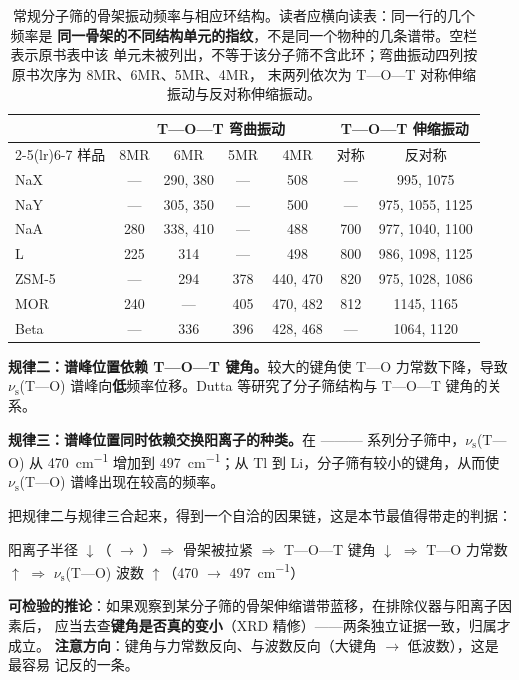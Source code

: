\begin{table}[htbp]
\centering
\caption{常规分子筛的骨架振动频率与相应环结构。读者应横向读表：同一行的几个频率是
\textbf{同一骨架的不同结构单元的指纹}，不是同一个物种的几条谱带。空栏表示原书表中该
单元未被列出，不等于该分子筛不含此环；弯曲振动四列按原书次序为 8MR、6MR、5MR、4MR，
末两列依次为 T—O—T 对称伸缩振动与反对称伸缩振动。}
\label{tab:zeolite-ring}
{\srcsize
\begin{tabularx}{\columnwidth}{@{}lcccccc@{}}
\toprule
 & \multicolumn{4}{c}{T—O—T 弯曲振动} & \multicolumn{2}{c}{T—O—T 伸缩振动} \\
\cmidrule(lr){2-5}\cmidrule(lr){6-7}
样品 & 8MR & 6MR & 5MR & 4MR & 对称 & 反对称 \\
\midrule
NaX   & --- & 290, 380 & --- & 508 & --- & 995, 1075 \\
NaY   & --- & 305, 350 & --- & 500 & --- & 975, 1055, 1125 \\
NaA   & 280 & 338, 410 & --- & 488 & 700 & 977, 1040, 1100 \\
L     & 225 & 314 & --- & 498 & 800 & 986, 1098, 1125 \\
ZSM-5 & --- & 294 & 378 & 440, 470 & 820 & 975, 1028, 1086 \\
MOR   & 240 & --- & 405 & 470, 482 & 812 & 1145, 1165 \\
Beta  & --- & 336 & 396 & 428, 468 & --- & 1064, 1120 \\
\bottomrule
\end{tabularx}}
\end{table}

\textbf{规律二：谱峰位置依赖 T—O—T 键角。}较大的键角使 T—O 力常数下降，导致
$\nu_{\mathrm{s}}$(T—O) 谱峰向\textbf{低}频率位移。Dutta 等研究了分子筛结构与
T—O—T 键角的关系。

\textbf{规律三：谱峰位置同时依赖交换阳离子的种类。}在
——— 系列分子筛中，$\nu_{\mathrm{s}}$(T—O) 从
\qty{470}{cm^{-1}} 增加到 \qty{497}{cm^{-1}}；从 Tl 到 Li，分子筛有较小的键角，从而使
$\nu_{\mathrm{s}}$(T—O) 谱峰出现在较高的频率。

\begin{principle}
把规律二与规律三合起来，得到一个自洽的因果链，这是本节最值得带走的判据：

\begin{center}
阳离子半径 $\downarrow$（ $\rightarrow$ ）$\Rightarrow$ 骨架被拉紧
$\Rightarrow$ T—O—T 键角 $\downarrow$ $\Rightarrow$ T—O 力常数 $\uparrow$
$\Rightarrow$ $\nu_{\mathrm{s}}$(T—O) 波数 $\uparrow$（470 $\rightarrow$ \qty{497}{cm^{-1}}）
\end{center}

\textbf{可检验的推论}：如果观察到某分子筛的骨架伸缩谱带蓝移，在排除仪器与阳离子因素后，
应当去查\textbf{键角是否真的变小}（XRD 精修）——两条独立证据一致，归属才成立。
\textbf{注意方向}：键角与力常数反向、与波数反向（大键角 $\rightarrow$ 低波数），这是最容易
记反的一条。
\end{principle}

